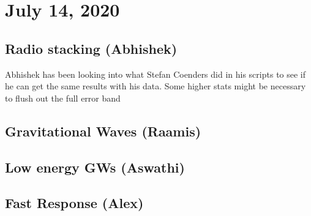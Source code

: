 \chapter{July 14, 2020}
\section{Radio stacking (Abhishek)}
Abhishek has been looking into what Stefan Coenders did in his scripts to see if he can get the same results with his data. Some higher stats might be necessary to flush out the full error band

\section{Gravitational Waves (Raamis)}
 

\section{Low energy GWs (Aswathi)}


\section{Fast Response (Alex)}